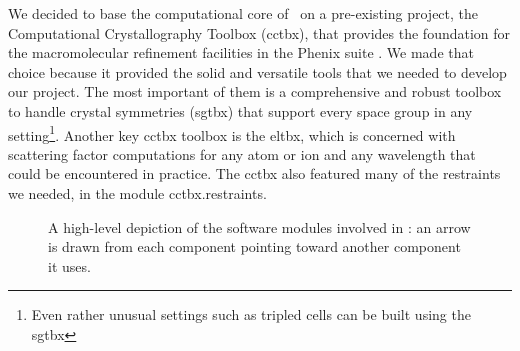 \documentclass[pdf]{iucr}
\begin{document}
We decided to base the computational core of \olexrefine\ on a pre-existing project, the Computational Crystallography Toolbox (cctbx), that provides the foundation for the macromolecular refinement facilities in the Phenix suite . We made that choice because it provided the solid and versatile tools  that we needed to develop our project. The most important of them is a comprehensive and robust toolbox to handle crystal symmetries (sgtbx) that support every space group in any setting\footnote{Even rather unusual settings such as tripled cells can be built using the sgtbx}. Another key cctbx toolbox is the eltbx, which is concerned with scattering factor computations for any atom or ion and any wavelength that could be encountered in practice. The cctbx also featured many of the restraints we needed, in the module cctbx.restraints. 

\begin{figure}
\caption{A high-level depiction of the software modules involved in \olexrefine: an arrow is drawn from each component pointing toward another component it uses.}
\label{fig:software:modules}
\end{figure}
\end{document}
